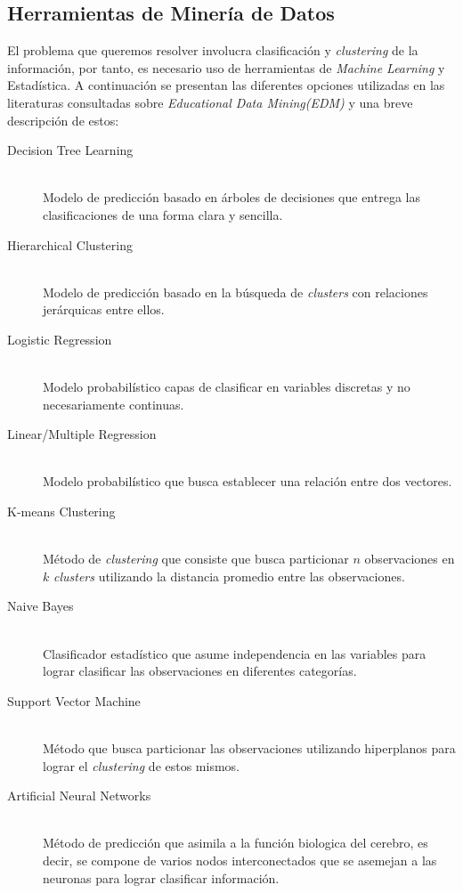 \subsection{Herramientas de Minería de Datos}
El problema que queremos resolver involucra clasificación y \textit{clustering} de la información, por tanto, es necesario uso de herramientas de \textit{Machine Learning} y Estadística\cite{barber}.
\newline
A continuación se presentan las diferentes opciones utilizadas en las literaturas consultadas sobre \textit{Educational Data Mining(EDM)}\cite{EDMSurv} y una breve descripción de estos:
\begin{description}
  \item[Decision Tree Learning] \hfill \\
  Modelo de predicción basado en árboles de decisiones que entrega las clasificaciones de una forma clara y sencilla.
  \item[Hierarchical Clustering] \hfill \\
  Modelo de predicción basado en la búsqueda de \textit{clusters} con relaciones jerárquicas entre ellos.
  \item[Logistic Regression] \hfill \\
  Modelo probabilístico capas de clasificar en variables discretas y no necesariamente continuas.
    \item[Linear/Multiple Regression] \hfill \\
  Modelo probabilístico que busca establecer una relación entre dos vectores.
  \item[K-means Clustering] \hfill \\
  Método de \textit{clustering} que consiste que busca particionar $n$ observaciones en $k$ \textit{clusters} utilizando la distancia promedio entre las observaciones.
  \item[Naive Bayes] \hfill \\
  Clasificador estadístico que asume independencia en las variables para lograr clasificar las observaciones en diferentes categorías.
  \item[Support Vector Machine] \hfill \\
  Método que busca particionar las observaciones utilizando hiperplanos para lograr el \textit{clustering} de estos mismos.
  \item[Artificial Neural Networks] \hfill \\
  Método de predicción que asimila a la función biologica del cerebro, es decir, se compone de varios nodos interconectados que se asemejan a las neuronas para lograr clasificar información.
\end{description}
